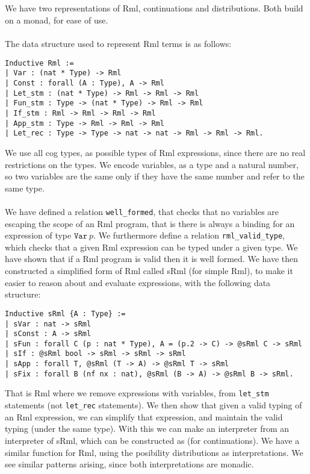 \documentclass[11pt, leqno]{article}
\newcommand{\wellformed}{\texttt{well\_formed}}
\newcommand{\valid}{\texttt{rml\_valid\_type}}
\begin{document}
\subsection{\rml}
We have two representations of Rml, continuations and distributions. Both build on a monad, for ease of use.
\\ \\
The data structure used to represent Rml terms is as follows:
\begin{center}
  \begin{minipage}{0.7\linewidth}
    \begin{lstlisting}[language=coq]
Inductive Rml :=
| Var : (nat * Type) -> Rml
| Const : forall (A : Type), A -> Rml
| Let_stm : (nat * Type) -> Rml -> Rml -> Rml
| Fun_stm : Type -> (nat * Type) -> Rml -> Rml
| If_stm : Rml -> Rml -> Rml -> Rml
| App_stm : Type -> Rml -> Rml -> Rml
| Let_rec : Type -> Type -> nat -> nat -> Rml -> Rml -> Rml.
    \end{lstlisting}
  \end{minipage}
\end{center}
We use all cog types, as possible types of Rml expressions, since there are no real restrictions on the types. We encode variables, as a type and a natural number, so two variables are the same only if they have the same number and refer to the same type.
\\ \\
We have defined a relation \wellformed, that checks that no variables are escaping the scope of an Rml program, that is there is always a binding for an expression of type \(\mathtt{Var}~p\). We furthermore define a relation \valid, which checks that a given Rml expression can be typed under a given type. We have shown that if a Rml program is valid then it is well formed. We have then constructed a simplified form of Rml called sRml (for simple Rml), to make it easier to reason about and evaluate expressions, with the following data structure:
\begin{center}
  \begin{minipage}{0.7\linewidth}
    \begin{lstlisting}[language=coq]
Inductive sRml {A : Type} :=
| sVar : nat -> sRml
| sConst : A -> sRml
| sFun : forall C (p : nat * Type), A = (p.2 -> C) -> @sRml C -> sRml
| sIf : @sRml bool -> sRml -> sRml -> sRml
| sApp : forall T, @sRml (T -> A) -> @sRml T -> sRml
| sFix : forall B (nf nx : nat), @sRml (B -> A) -> @sRml B -> sRml.
    \end{lstlisting}
  \end{minipage}
\end{center}
That is Rml where we remove expressions with variables, from \texttt{let\_stm} statements (not \texttt{let\_rec} statements). We then show that given a valid typing of an Rml expression, we can simplify that expression, and maintain the valid typing (under the same type). With this we can make an interpreter from an interpreter of sRml, which can be constructed as (for continuations). We have a similar function for Rml, using the posibility distributions as interpretations. We see similar patterns arising, since both interpretations are monadic.
\end{document}
